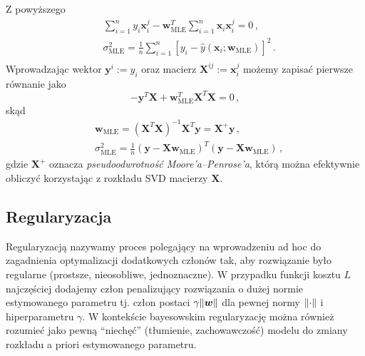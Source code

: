 \documentclass{myclass}
\numberwithin{equation}{subsection}
\begin{document}
Z powyższego
\begin{equation}
    \begin{split}
        &\sum_{i=1}^n y_i\bm{x}_i^j - \bm{w}_\mathrm{MLE}^T\sum_{i=1}^n\bm{x}_i\bm{x}_i^j = 0\,,\\
        &\sigma_\mathrm{MLE}^2 = \frac{1}{n} \sum_{i=1}^n \left[y_i - \hat{y}(\bm{x}_i; \bm{w}_\mathrm{MLE})\right]^2\,.\\
    \end{split}
\end{equation}
Wprowadzając wektor \(\bm{y}^i := y_i\) oraz macierz \(\bm{X}^{ij} := \bm{x}_i^j\) możemy zapisać
pierwsze równanie jako
\begin{equation}
    -\bm{y}^T\bm{X} + \bm{w}^T_\mathrm{MLE} \bm{X}^T\bm{X} = 0\,,
\end{equation}
skąd
\begin{equation}\boxed{
    \begin{split}
        &\bm{w}_\mathrm{MLE} = \left(\bm{X}^T\bm{X}\right)^{-1}\bm{X}^T\bm{y} = \bm{X}^+\bm{y}\,,\\
        &\sigma_\mathrm{MLE}^2 = \frac{1}{n}\left(\bm{y} - \bm{X}\bm{w}_\mathrm{MLE}\right)^T\left(\bm{y} - \bm{X}\bm{w}_\mathrm{MLE}\right)\,,
    \end{split}
}\end{equation}
gdzie \(\bm{X}^+\) oznacza \emph{pseudoodwrotność Moore'a--Penrose'a}, którą można efektywnie
obliczyć korzystając z rozkładu SVD macierzy \(\bm{X}\).


\subsection{Regularyzacja}

Regularyzacją  nazywamy proces polegający na wprowadzeniu ad hoc do zagadnienia optymalizacji
dodatkowych członów tak, aby rozwiązanie było regularne (prostsze, nieosobliwe, jednoznaczne). W
przypadku funkcji kosztu \(L\) najczęściej dodajemy człon penalizujący rozwiązania o dużej normie
estymowanego parametru tj. człon postaci \(\gamma \norm{\bm{w}}\) dla pewnej normy \(\norm{\cdot}\)
i hiperparametru \(\gamma\). W kontekście bayesowskim regularyzację można również rozumieć jako
pewną \enquote{niechęć} (tłumienie, zachowawczość) modelu do zmiany rozkładu a priori estymowanego
parametru.
\end{document}

